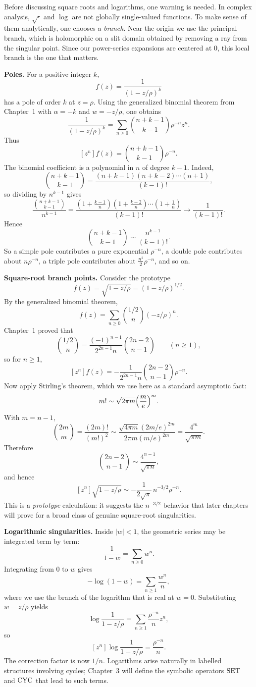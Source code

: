 Before discussing square roots and logarithms, one warning is needed. In complex analysis, $\sqrt{\cdot}$ and $\log$ are not globally single-valued functions. To make sense of them analytically, one chooses a \emph{branch}. Near the origin we use the principal branch, which is holomorphic on a slit domain obtained by removing a ray from the singular point. Since our power-series expansions are centered at $0$, this local branch is the one that matters.

\textbf{Poles.}
For a positive integer $k$,
\[
  f(z) = \frac{1}{(1-z/\rho)^k}
\]
has a pole of order $k$ at $z=\rho$. Using the generalized binomial theorem from Chapter~1 with $\alpha=-k$ and $w=-z/\rho$, one obtains
\[
  \frac{1}{(1-z/\rho)^k}
  = \sum_{n \ge 0} \binom{n+k-1}{k-1}\rho^{-n}z^n.
\]
Thus
\[
  [z^n]f(z) = \binom{n+k-1}{k-1}\rho^{-n}.
\]
The binomial coefficient is a polynomial in $n$ of degree $k-1$. Indeed,
\[
  \binom{n+k-1}{k-1}
  = \frac{(n+k-1)(n+k-2)\cdots(n+1)}{(k-1)!},
\]
so dividing by $n^{k-1}$ gives
\[
  \frac{\binom{n+k-1}{k-1}}{n^{k-1}}
  = \frac{(1+\frac{k-1}{n})(1+\frac{k-2}{n})\cdots(1+\frac{1}{n})}{(k-1)!}
  \to \frac{1}{(k-1)!}.
\]
Hence
\[
  \binom{n+k-1}{k-1} \sim \frac{n^{k-1}}{(k-1)!}.
\]
So a simple pole contributes a pure exponential $\rho^{-n}$, a double pole contributes about $n\rho^{-n}$, a triple pole contributes about $\frac{n^2}{2}\rho^{-n}$, and so on.

\textbf{Square-root branch points.}
Consider the prototype
\[
  f(z) = \sqrt{1-z/\rho} = (1-z/\rho)^{1/2}.
\]
By the generalized binomial theorem,
\[
  f(z) = \sum_{n \ge 0} \binom{1/2}{n}(-z/\rho)^n.
\]
Chapter~1 proved that
\[
  \binom{1/2}{n} = \frac{(-1)^{n-1}}{2^{2n-1}n}\binom{2n-2}{n-1}
  \qquad (n \ge 1),
\]
so for $n \ge 1$,
\[
  [z^n]f(z)
  = -\frac{1}{2^{2n-1}n}\binom{2n-2}{n-1}\rho^{-n}.
\]
Now apply Stirling's theorem, which we use here as a standard asymptotic fact:
\[
  m! \sim \sqrt{2\pi m}\Bigl(\frac{m}{e}\Bigr)^m.
\]
With $m=n-1$,
\[
  \binom{2m}{m}
  = \frac{(2m)!}{(m!)^2}
  \sim \frac{\sqrt{4\pi m}(2m/e)^{2m}}{2\pi m (m/e)^{2m}}
  = \frac{4^m}{\sqrt{\pi m}}.
\]
Therefore
\[
  \binom{2n-2}{n-1} \sim \frac{4^{n-1}}{\sqrt{\pi n}},
\]
and hence
\[
  [z^n]\sqrt{1-z/\rho}
  \sim -\frac{1}{2\sqrt{\pi}}\, n^{-3/2}\rho^{-n}.
\]
This is a \emph{prototype} calculation: it suggests the $n^{-3/2}$ behavior that later chapters will prove for a broad class of genuine square-root singularities.

\textbf{Logarithmic singularities.}
Inside $|w|<1$, the geometric series may be integrated term by term:
\[
  \frac{1}{1-w} = \sum_{n \ge 0} w^n.
\]
Integrating from $0$ to $w$ gives
\[
  -\log(1-w) = \sum_{n \ge 1} \frac{w^n}{n},
\]
where we use the branch of the logarithm that is real at $w=0$. Substituting $w=z/\rho$ yields
\[
  \log\frac{1}{1-z/\rho} = \sum_{n \ge 1} \frac{\rho^{-n}}{n} z^n,
\]
so
\[
  [z^n]\log\frac{1}{1-z/\rho} = \frac{\rho^{-n}}{n}.
\]
The correction factor is now $1/n$. Logarithms arise naturally in labelled structures involving cycles; Chapter~3 will define the symbolic operators $\operatorname{SET}$ and $\operatorname{CYC}$ that lead to such terms.

